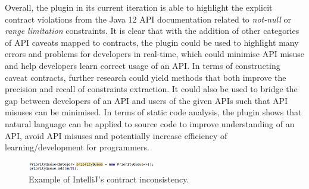 Overall, the plugin in its current iteration is able to highlight the explicit contract violations from the Java 12 API documentation related to \textit{not-null} or \textit{range limitation} constraints. It is clear that with the addition of other categories of API caveats mapped to contracts, the plugin could be used to highlight many errors and problems for developers in real-time, which could minimise API misuse and help developers learn correct usage of an API. In terms of constructing caveat contracts, further research could yield methods that both improve the precision and recall of constraints extraction. It could also be used to bridge the gap between developers of an API and users of the given APIs such that API misuses can be minimised. In terms of static code analysis, the plugin shows that natural language can be applied to source code to improve understanding of an API, avoid API misuses and potentially increase efficiency of learning/development for programmers.

\begin{figure}[h]
	\label{fig:intellij-inspection-off}
	\centering
	\includegraphics[width=0.5\textwidth]{figs/intellij-inspection-off.png}
	\caption{Example of IntelliJ's contract inconsistency.}
\end{figure}

